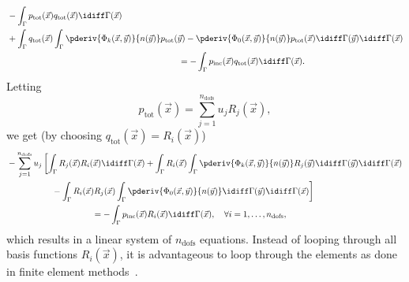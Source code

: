 \begin{align*}
	&-\int_\Gamma p_{\mathrm{tot}}(\vec{x})q_{\mathrm{tot}}(\vec{x})\idiff\Gamma(\vec{x})\\
	&+ \int_\Gamma q_{\mathrm{tot}}(\vec{x})\int_\Gamma \pderiv{\Phi_k(\vec{x},\vec{y})}{n(\vec{y})}p_{\mathrm{tot}}(\vec{y}) - \pderiv{\Phi_0(\vec{x},\vec{y})}{n(\vec{y})} p_{\mathrm{tot}}(\vec{x}) \idiff\Gamma(\vec{y})\idiff\Gamma(\vec{x}) \\
	&{\hskip20em\relax}= -\int_\Gamma p_{\mathrm{inc}}(\vec{x})q_{\mathrm{tot}}(\vec{x})\idiff\Gamma(\vec{x}).
\end{align*}
Letting
\begin{equation*}
	p_{\mathrm{tot}}(\vec{x}) = \sum_{j=1}^{n_{\mathrm{dofs}}} u_j R_j(\vec{x}),
\end{equation*}
we get (by choosing $q_{\mathrm{tot}}(\vec{x})=R_i(\vec{x})$)
\begin{align*}
	&-\sum_{j=1}^{n_{\mathrm{dofs}}}u_j \left[\int_\Gamma R_j(\vec{x})R_i(\vec{x})\idiff\Gamma(\vec{x})+ \int_\Gamma R_i(\vec{x})\int_\Gamma \pderiv{\Phi_k(\vec{x},\vec{y})}{n(\vec{y})}R_j(\vec{y}) \idiff\Gamma(\vec{y})\idiff\Gamma(\vec{x})\right.\\ 
	&\left.{\hskip5em\relax}-\int_\Gamma R_i(\vec{x}) R_j(\vec{x})\int_\Gamma \pderiv{\Phi_0(\vec{x},\vec{y})}{n(\vec{y})} \idiff\Gamma(\vec{y})\idiff\Gamma(\vec{x})\right]\\
	&{\hskip10em\relax}= -\int_\Gamma p_{\mathrm{inc}}(\vec{x})R_i(\vec{x})\idiff\Gamma(\vec{x}),\quad \forall i=1,\dots, n_{\mathrm{dofs}},
\end{align*}
which results in a linear system of $n_{\mathrm{dofs}}$ equations. Instead of looping through all basis functions $R_i(\vec{x})$, it is advantageous to loop through the elements as done in finite element methods~\cite{Simpson2014aib}.

